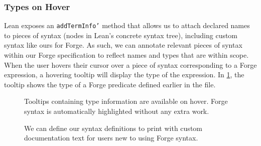 \subsubsection{Types on Hover}

Lean exposes an \texttt{addTermInfo'} method that allows us to attach declared names to pieces of syntax (nodes in Lean's concrete syntax tree), including custom syntax like ours for Forge. As such, we can annotate relevant pieces of syntax within our Forge specification to reflect names and types that are within scope. When the user hovers their cursor over a piece of syntax corresponding to a Forge expression, a hovering tooltip will display the type of the expression. In \cref{fig:sc-highlighting-hover}, the tooltip shows the type of a Forge predicate defined earlier in the file. 

\begin{figure}
  \centering
  \caption{Tooltips containing type information are available on hover. Forge syntax is automatically highlighted without any extra work.}
  \label{fig:sc-highlighting-hover}
\end{figure}

\begin{figure}
  \begin{center}
  \end{center}
  \begin{center}
    \centering{}
  \end{center}
  \caption{We can define our syntax definitions to print with custom documentation text for users new to using Forge syntax. }
  \label{fig:sc-docstrings}
\end{figure}

